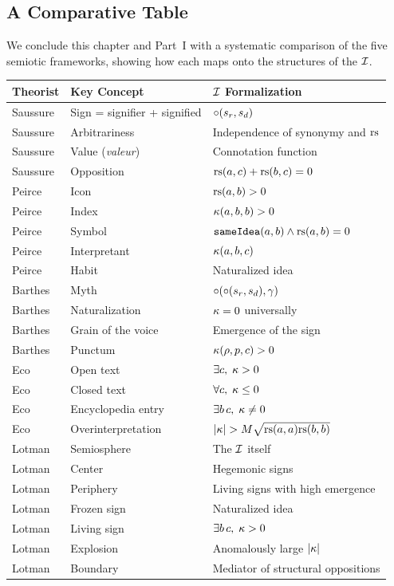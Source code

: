 \subsection{A Comparative Table}

We conclude this chapter and Part~I with a systematic comparison of
the five semiotic frameworks, showing how each maps onto the structures
of the $\mathcal{I}$.

\begin{center}
\begin{tabular}{lll}
\textbf{Theorist} & \textbf{Key Concept} & \textbf{$\mathcal{I}$ Formalization} \\
\hline
Saussure & Sign = signifier + signified & $\circ(s_r, s_d)$ \\
Saussure & Arbitrariness & Independence of synonymy and $\mathrm{rs}$ \\
Saussure & Value (\textit{valeur}) & Connotation function \\
Saussure & Opposition & $\mathrm{rs}(a,c) + \mathrm{rs}(b,c) = 0$ \\
Peirce & Icon & $\mathrm{rs}(a, b) > 0$ \\
Peirce & Index & $\kappa(a, b, b) > 0$ \\
Peirce & Symbol & $\texttt{sameIdea}(a,b) \wedge \mathrm{rs}(a,b) = 0$ \\
Peirce & Interpretant & $\kappa(a, b, c)$ \\
Peirce & Habit & Naturalized idea \\
Barthes & Myth & $\circ(\circ(s_r, s_d), \gamma)$ \\
Barthes & Naturalization & $\kappa = 0$ universally \\
Barthes & Grain of the voice & Emergence of the sign \\
Barthes & Punctum & $\kappa(\rho, p, c) > 0$ \\
Eco & Open text & $\exists c,\; \kappa > 0$ \\
Eco & Closed text & $\forall c,\; \kappa \leq 0$ \\
Eco & Encyclopedia entry & $\exists b\,c,\; \kappa \neq 0$ \\
Eco & Overinterpretation & $|\kappa| > M\sqrt{\mathrm{rs}(a,a)\mathrm{rs}(b,b)}$ \\
Lotman & Semiosphere & The $\mathcal{I}$ itself \\
Lotman & Center & Hegemonic signs \\
Lotman & Periphery & Living signs with high emergence \\
Lotman & Frozen sign & Naturalized idea \\
Lotman & Living sign & $\exists b\,c,\; \kappa > 0$ \\
Lotman & Explosion & Anomalously large $|\kappa|$ \\
Lotman & Boundary & Mediator of structural oppositions \\
\end{tabular}
\end{center}

